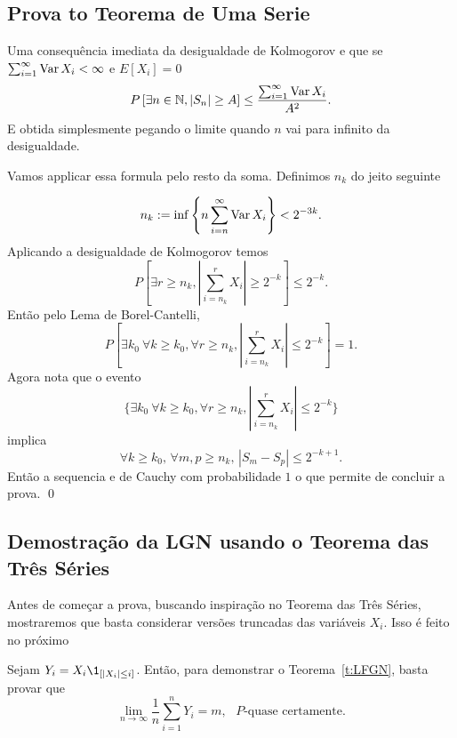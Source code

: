 \begin{topics}
\subsection{Prova to Teorema de Uma Serie}

Uma consequência imediata da desigualdade de Kolmogorov e que se \\ $\sum_{i=1}^{\infty} \operatorname{Var} X_i<\infty$ e $E[X_i]=0$
$$P\left[ \exists n\in {\ensuremath{\mathbb N}},  |S_n| \ge A \right] \le \frac{\sum_{i=1}^{\infty} \operatorname{Var} X_i}{A^2}.$$
E obtida simplesmente pegando o limite quando $n$ vai para infinito da desigualdade.

\medskip

Vamos applicar essa formula pelo resto da soma. Definimos $n_k$ do jeito seguinte

\begin{equation}
 n_k:= \inf\left\{ n \sum_{i=n}^{\infty} \operatorname{Var} X_i \right\}<2^{-3k}.
\end{equation}
Aplicando a desigualdade de Kolmogorov temos 
$$ P\left[ \exists r\ge n_k,  |\sum_{i=n_k}^r X_i| \ge 2^{-k} \right]\le 2^{-k}.$$
Então pelo Lema de Borel-Cantelli,
\begin{equation}
 P\left[ \exists k_0 \ \forall k\ge k_0, \forall r\ge n_k, \left|\sum_{i=n_k}^r X_i\right|\le 2^{-k} \right]=1.
\end{equation}
Agora nota que o evento  $$\{\exists k_0 \ \forall k\ge k_0, \forall r\ge n_k, |\sum_{i=n_k}^r X_i|\le 2^{-k}\}$$ 
implica  $$ \forall k\ge k_0,\, \forall m,p\ge n_k, \, 
|S_m-S_p|\le 2^{-k+1}.$$ 
Então a sequencia e de Cauchy com probabilidade $1$ o que permite de concluir a prova. \qed




\subsection{Demostração da LGN usando o Teorema das Três Séries}

Antes de começar a prova, buscando inspiração no Teorema das Três Séries, mostraremos que basta considerar versões truncadas das variáveis $X_i$.
Isso é feito no próximo

\begin{lemma}
  \label{l:LFGN}
  Sejam $Y_i = X_i \1_{[|X_i| \leq i]}$.
  Então, para demonstrar o Teorema~\ref{t:LFGN}, basta provar que
  \begin{equation}
    \lim_{n \to \infty}\frac{1}{n} \sum_{i=1}^n Y_i = m, \text{ $P$-quase certamente.}
  \end{equation}
\end{lemma}


\end{topics}
